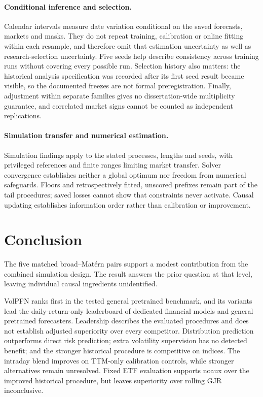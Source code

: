 \paragraph{Conditional inference and selection.}
Calendar intervals measure date variation conditional on the saved forecasts, markets and masks. They do not repeat training, calibration or online fitting within each resample, and therefore omit that estimation uncertainty as well as research-selection uncertainty. Five seeds help describe consistency across training runs without covering every possible run. Selection history also matters: the historical analysis specification was recorded after its first seed result became visible, so the documented freezes are not formal preregistration. Finally, adjustment within separate families gives no dissertation-wide multiplicity guarantee, and correlated market signs cannot be counted as independent replications.

\paragraph{Simulation transfer and numerical estimation.}
Simulation findings apply to the stated processes, lengths and seeds, with privileged references and finite ranges limiting market transfer. Solver convergence establishes neither a global optimum nor freedom from numerical safeguards. Floors and retrospectively fitted, unscored prefixes remain part of the tail procedures; saved losses cannot show that constraints never activate. Causal updating establishes information order rather than calibration or improvement.

\section{Conclusion}

The five matched broad--Mat\'ern pairs support a modest contribution from the combined simulation design. The result answers the prior question at that level, leaving individual causal ingredients unidentified.

VolPFN ranks first in the tested general pretrained benchmark, and its variants lead the daily-return-only leaderboard of dedicated financial models and general pretrained forecasters. Leadership describes the evaluated procedures and does not establish adjusted superiority over every competitor. Distribution prediction outperforms direct risk prediction; extra volatility supervision has no detected benefit; and the stronger historical procedure is competitive on indices. The intraday blend improves on TTM-only calibration controls, while stronger alternatives remain unresolved. Fixed ETF evaluation supports noaux over the improved historical procedure, but leaves superiority over rolling GJR inconclusive.

